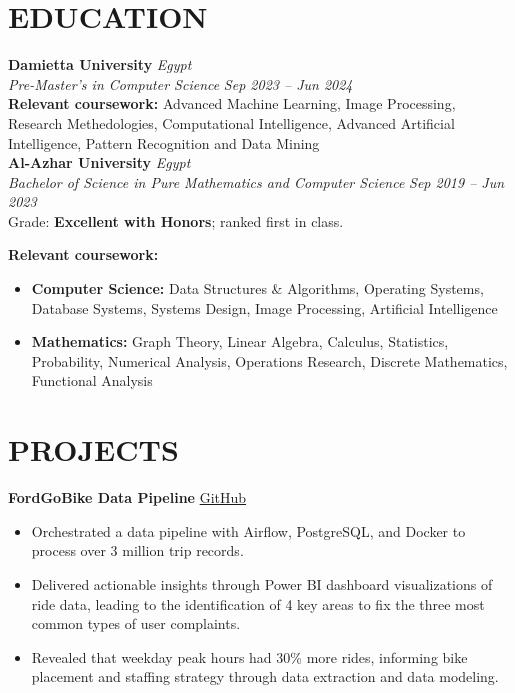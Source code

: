 \documentclass[11pt]{article}
\begin{document}
\section{EDUCATION}

\textbf{Damietta University} \hfill \textit{Egypt} \\
\textit{Pre-Master’s in Computer Science} \hfill \textit{Sep 2023 – Jun 2024} \\
\textbf{Relevant coursework:} Advanced Machine Learning, Image Processing, Research Methedologies, Computational Intelligence, Advanced Artificial Intelligence, Pattern Recognition and Data Mining\\

\textbf{Al-Azhar University} \hfill \textit{Egypt} \\
\textit{Bachelor of Science in Pure Mathematics and Computer Science} \hfill \textit{Sep 2019 – Jun 2023} \\
 Grade: \textbf{Excellent with Honors}; ranked first in class. 

 \textbf{Relevant coursework:}
  \begin{itemize}
    \item \textbf{Computer Science:} Data Structures \& Algorithms, Operating Systems, Database Systems, Systems Design, Image Processing, Artificial Intelligence
    \item \textbf{Mathematics:} Graph Theory, Linear Algebra, Calculus, Statistics, Probability, Numerical Analysis, Operations Research, Discrete Mathematics, Functional Analysis\\
  \end{itemize}


\section{PROJECTS}

\textbf{FordGoBike Data Pipeline} \hfill \href{https://github.com/Mostafa-Elnagar/FordGoBike-data-pipeline}{GitHub}
\begin{itemize}
  \item Orchestrated a data pipeline with Airflow, PostgreSQL, and Docker to process over 3 million trip records.
  \item Delivered actionable insights through Power BI dashboard visualizations of ride data, leading to the identification of 4 key areas to fix the three most common types of user complaints.
  \item Revealed that weekday peak hours had 30\% more rides, informing bike placement and staffing strategy through data extraction and data modeling.\\
\end{itemize}
\end{document}
